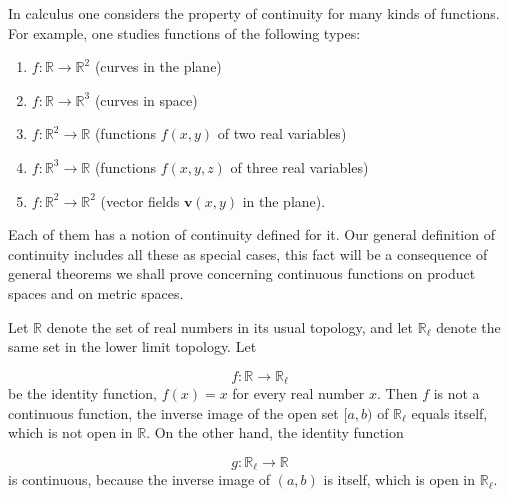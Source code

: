 \begin{centeredblock*}
\begin{example}
\label{ex:\thesection.\theexample}
 In calculus one considers the property of continuity for many kinds of functions. For example, one studies functions of the following types:

 \begin{enumerate}[itemsep=0.2em, parsep=0pt, topsep=0pt, partopsep=0pt, leftmargin=3em, label={}]
 \item \(f : \mathbb{R} \rightarrow {\mathbb{R}}^{2}\) (curves in the plane)

 \item \(f : \mathbb{R} \rightarrow {\mathbb{R}}^{3}\) (curves in space)

 \item \(f : \mathbb{R}^{2} \rightarrow \mathbb{R}\) (functions \(f( {x,y})\) of two real variables)

 \item \(f : \mathbb{R}^{3} \rightarrow \mathbb{R}\) (functions \(f( {x,y,z})\) of three real variables)

 \item \(f : \mathbb{R}^{2} \rightarrow {\mathbb{R}}^{2}\) (vector fields \(\mathbf{v}( {x,y})\) in the plane).
 \end{enumerate}
 Each of them has a notion of continuity defined for it. Our general definition of continuity includes all these as special cases, this fact will be a consequence of general theorems we shall prove concerning continuous functions on product spaces and on metric spaces.
 \end{example}
\end{centeredblock*}

\begin{centeredblock*}
\begin{example}
\label{ex:\thesection.\theexample}
 Let \(\mathbb{R}\) denote the set of real numbers in its usual topology, and let \(\mathbb{R}_{\ell }\) denote the same set in the lower limit topology. Let

 \[
 f : \mathbb{R} \rightarrow {\mathbb{R}}_{\ell }
 \]
 be the identity function, \(f(x) = x\) for every real number \(x\). Then \(f\) is not a continuous function, the inverse image of the open set \(\lbrack a,b)\) of \(\mathbb{R}_{\ell }\) equals itself, which is not open in \(\mathbb{R}\). On the other hand, the identity function

 \[
 g : \mathbb{R}_{\ell } \rightarrow \mathbb{R}
 \]
 is continuous, because the inverse image of \((a, b)\) is itself, which is open in \(\mathbb{R}_{\ell }\).
\end{example}
\end{centeredblock*}


